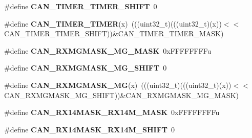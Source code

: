 \begin{DoxyCompactItemize}
\item 
\#define {\bfseries C\+A\+N\+\_\+\+T\+I\+M\+E\+R\+\_\+\+T\+I\+M\+E\+R\+\_\+\+S\+H\+I\+FT}~0\hypertarget{group__CAN__Register__Masks_gac979f0c3637eddae258cc50c0e9bb9cf}{}\label{group__CAN__Register__Masks_gac979f0c3637eddae258cc50c0e9bb9cf}

\item 
\#define {\bfseries C\+A\+N\+\_\+\+T\+I\+M\+E\+R\+\_\+\+T\+I\+M\+ER}(x)~(((uint32\+\_\+t)(((uint32\+\_\+t)(x))$<$$<$C\+A\+N\+\_\+\+T\+I\+M\+E\+R\+\_\+\+T\+I\+M\+E\+R\+\_\+\+S\+H\+I\+FT))\&C\+A\+N\+\_\+\+T\+I\+M\+E\+R\+\_\+\+T\+I\+M\+E\+R\+\_\+\+M\+A\+SK)\hypertarget{group__CAN__Register__Masks_gaf7cbb5a3d2da0895f9e873b71d8c29e8}{}\label{group__CAN__Register__Masks_gaf7cbb5a3d2da0895f9e873b71d8c29e8}

\item 
\#define {\bfseries C\+A\+N\+\_\+\+R\+X\+M\+G\+M\+A\+S\+K\+\_\+\+M\+G\+\_\+\+M\+A\+SK}~0x\+F\+F\+F\+F\+F\+F\+F\+Fu\hypertarget{group__CAN__Register__Masks_ga2d7a5f68a7047b3c535a554cc113ef4b}{}\label{group__CAN__Register__Masks_ga2d7a5f68a7047b3c535a554cc113ef4b}

\item 
\#define {\bfseries C\+A\+N\+\_\+\+R\+X\+M\+G\+M\+A\+S\+K\+\_\+\+M\+G\+\_\+\+S\+H\+I\+FT}~0\hypertarget{group__CAN__Register__Masks_ga1ace67c70d9f25a27ca39ce78cb0034d}{}\label{group__CAN__Register__Masks_ga1ace67c70d9f25a27ca39ce78cb0034d}

\item 
\#define {\bfseries C\+A\+N\+\_\+\+R\+X\+M\+G\+M\+A\+S\+K\+\_\+\+MG}(x)~(((uint32\+\_\+t)(((uint32\+\_\+t)(x))$<$$<$C\+A\+N\+\_\+\+R\+X\+M\+G\+M\+A\+S\+K\+\_\+\+M\+G\+\_\+\+S\+H\+I\+FT))\&C\+A\+N\+\_\+\+R\+X\+M\+G\+M\+A\+S\+K\+\_\+\+M\+G\+\_\+\+M\+A\+SK)\hypertarget{group__CAN__Register__Masks_ga2b21343a7f07965355955eaec76021dc}{}\label{group__CAN__Register__Masks_ga2b21343a7f07965355955eaec76021dc}

\item 
\#define {\bfseries C\+A\+N\+\_\+\+R\+X14\+M\+A\+S\+K\+\_\+\+R\+X14\+M\+\_\+\+M\+A\+SK}~0x\+F\+F\+F\+F\+F\+F\+F\+Fu\hypertarget{group__CAN__Register__Masks_ga4687420a607d4279e24fa93f4b486ec3}{}\label{group__CAN__Register__Masks_ga4687420a607d4279e24fa93f4b486ec3}

\item 
\#define {\bfseries C\+A\+N\+\_\+\+R\+X14\+M\+A\+S\+K\+\_\+\+R\+X14\+M\+\_\+\+S\+H\+I\+FT}~0\hypertarget{group__CAN__Register__Masks_ga9e74b131e8180656fe9eb73191b73869}{}\label{group__CAN__Register__Masks_ga9e74b131e8180656fe9eb73191b73869}


\end{DoxyCompactItemize}
